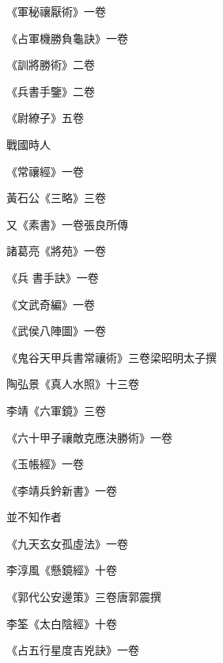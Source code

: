 \begin{pinyinscope}
 《軍秘禳厭術》一卷



 《占軍機勝負龜訣》一卷



 《訓將勝術》二卷



 《兵書手鑒》二卷



 《尉繚子》五卷



 戰國時人



 《常禳經》一卷



 黃石公《三略》三卷



 又《素書》一卷張良所傳



 諸葛亮《將苑》一卷



 《兵
 書手訣》一卷



 《文武奇編》一卷



 《武侯八陣圖》一卷



 《鬼谷天甲兵書常禳術》三卷梁昭明太子撰



 陶弘景《真人水照》十三卷



 李靖《六軍鏡》三卷



 《六十甲子禳敵克應決勝術》一卷



 《玉帳經》一卷



 《李靖兵鈐新書》一卷



 並不知作者



 《九天玄女孤虛法》一卷



 李淳風《懸鏡經》十卷



 《郭代公安邊策》三卷唐郭震撰



 李筌《太白陰經》十卷



 《占五行星度吉兇訣》一卷




\end{pinyinscope}

